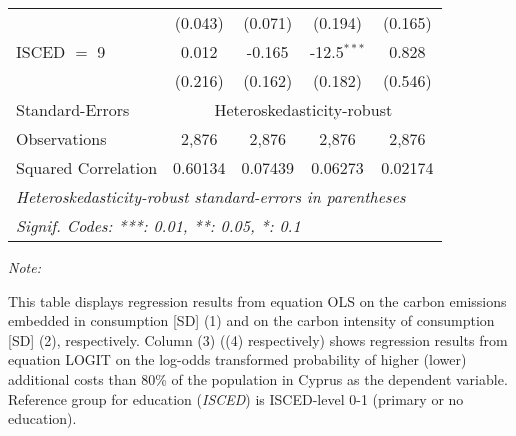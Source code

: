 \begin{table}[htbp!]
\begin{adjustbox}{width = 1\textwidth, max height = 0.95\textheight, center}
\begin{threeparttable}[b]
\begin{tabular}{lcccc}
                                 & (0.043)            & (0.071)            & (0.194)        & (0.165)\\   
            ISCED $=$ 9          & 0.012              & -0.165             & -12.5$^{***}$  & 0.828\\   
                                 & (0.216)            & (0.162)            & (0.182)        & (0.546)\\   
            \midrule 
            Standard-Errors & \multicolumn{4}{c}{Heteroskedasticity-robust} \\ 
            Observations         & 2,876              & 2,876              & 2,876          & 2,876\\  
            Squared Correlation  & 0.60134            & 0.07439            & 0.06273        & 0.02174\\  
            \midrule \midrule
            \multicolumn{5}{l}{\emph{Heteroskedasticity-robust standard-errors in parentheses}}\\
            \multicolumn{5}{l}{\emph{Signif. Codes: ***: 0.01, **: 0.05, *: 0.1}}\\
         \end{tabular}
         
         \begin{tablenotes}\item \medskip \textit{Note:}
            \item This table displays regression results from equation OLS on the carbon emissions embedded in consumption [SD] (1) and on the carbon intensity of consumption [SD] (2), respectively. 
                                      Column (3) ((4) respectively) shows regression results from equation LOGIT on the log-odds transformed probability of higher (lower) additional costs than 80\% of the population in Cyprus as the dependent variable. Reference group for education (\textit{ISCED}) is ISCED-level 0-1 (primary or no education).
         \end{tablenotes}
      \end{threeparttable}
   \end{adjustbox}
\end{table}


